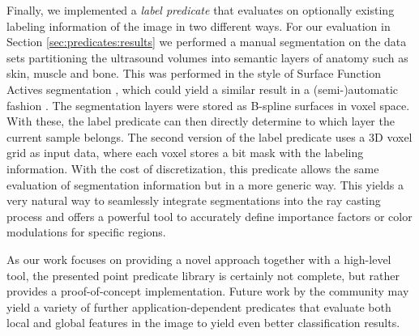Finally, we implemented a \emph{label predicate} that evaluates on optionally existing labeling information of the image in two different ways. 
For our evaluation in Section \ref{sec:predicates:results} we performed a manual segmentation on the data sets partitioning the ultrasound volumes into semantic layers of anatomy such as skin, muscle and bone. 
This was performed in the style of Surface Function Actives segmentation \cite{Duan09}, which could yield a similar result in a (semi-)automatic fashion \cite{Katouzian12}.
The segmentation layers were stored as B-spline surfaces in voxel space.
With these, the label predicate can then directly determine to which layer the current sample belongs.
The second version of the label predicate uses a 3D voxel grid as input data, where each voxel stores a bit mask with the labeling information.
With the cost of discretization, this predicate allows the same evaluation of segmentation information but in a more generic way.
This yields a very natural way to seamlessly integrate segmentations into the ray casting process and offers a powerful tool to accurately define importance factors or color modulations for specific regions. 

As our work focuses on providing a novel approach together with a high-level tool, the presented point predicate library is certainly not complete, but rather provides a proof-of-concept implementation. 
Future work by the community may yield a variety of further application-dependent predicates that evaluate both local and global features in the image to yield even better classification results. 


